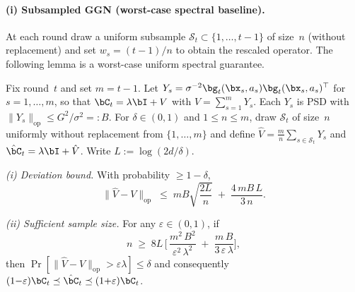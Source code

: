 \paragraph{(i) Subsampled GGN (worst-case spectral baseline).}
At each round draw a uniform subsample $\mathcal{S}_t\subset\{1,\dots,t{-}1\}$
of size~$n$ (without replacement) and set $w_s=(t{-}1)/n$ to obtain the
rescaled operator.
The following lemma is a worst-case uniform spectral guarantee.

\begin{lemma}\label{lem:subsample}
Fix round~$t$ and set $m=t{-}1$.
Let $Y_s = \sigma^{-2}\bg_t(\bx_s,a_s)\bg_t(\bx_s,a_s)^\top$ for
$s=1,\dots,m$, so that $\bC_t = \lambda\bI + V$ with $V=\sum_{s=1}^m Y_s$.
Each $Y_s$ is PSD with $\|Y_s\|_{\mathrm{op}}\le G^2/\sigma^2 =: B$.
For $\delta\in(0,1)$ and $1\le n\le m$, draw $\mathcal{S}_t$ of size~$n$
uniformly without replacement from
$\{1,\dots,m\}$ and define $\hat V = \tfrac{m}{n}\sum_{s\in\mathcal{S}_t}Y_s$
and $\hat\bC_t = \lambda\bI + \hat V$.
Write $L:=\log(2d/\delta)$.

\emph{(i) Deviation bound.}
With probability $\ge 1-\delta$,
\begin{equation}\label{eq:subsample-dev}
  \|\hat V - V\|_{\mathrm{op}}
  \;\le\;
  mB\sqrt{\frac{2L}{n}}
  \;+\;
  \frac{4\,mB\,L}{3\,n}.
\end{equation}

\emph{(ii) Sufficient sample size.}
For any $\varepsilon\in(0,1)$, if
\begin{equation}\label{eq:subsample-n}
  n \;\ge\; 8L\,\biggl[\,
    \frac{m^2\,B^2}{\varepsilon^2\,\lambda^2}
    \;+\;
    \frac{m\,B}{3\,\varepsilon\,\lambda}
  \biggr],
\end{equation}
then $\Pr[\|\hat V - V\|_{\mathrm{op}} > \varepsilon\lambda] \le \delta$
and consequently
$(1{-}\varepsilon)\bC_t\preceq\hat\bC_t\preceq(1{+}\varepsilon)\bC_t$.
\end{lemma}
